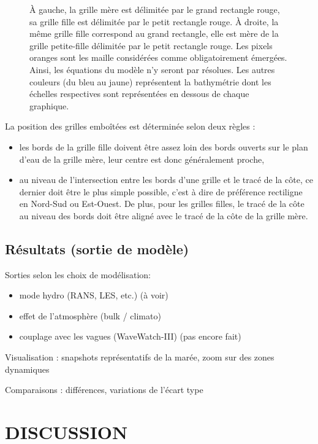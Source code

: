\documentclass[10pt,a4paper,titlepage]{article}
\begin{document}
\begin{figure}[h!]
{        À gauche, la grille mère est délimitée par le grand rectangle rouge, sa grille fille est délimitée par le petit rectangle rouge.
        À droite, la même grille fille correspond au grand rectangle, elle est mère de la grille petite-fille délimitée par le petit rectangle rouge.
        Les pixels oranges sont les maille considérées comme obligatoirement émergées. Ainsi, les équations du modèle n'y seront par résolues.
        Les autres couleurs (du bleu au jaune) représentent la bathymétrie dont les échelles respectives sont représentées en dessous de chaque graphique.
    }
    \label{fig:imbrication}
\end{figure}

La position des grilles emboîtées est déterminée selon deux règles :
\begin{itemize}
    \item les bords de la grille fille doivent être assez loin des bords ouverts sur le plan d'eau de la grille mère, leur centre est donc généralement proche,
    \item au niveau de l'intersection entre les bords d'une grille et le tracé de la côte, ce dernier doit être le plus simple possible, c'est à dire de préférence rectiligne en Nord-Sud ou Est-Ouest.
    De plus, pour les grilles filles, le tracé de la côte au niveau des bords doit être aligné avec le tracé de la côte de la grille mère.
\end{itemize}

\subsection{Résultats (sortie de modèle)}

Sorties selon les choix de modélisation:
\begin{itemize}
    \item mode hydro (RANS, LES, etc.) (à voir)
    \item effet de l'atmosphère (bulk / climato)
    \item couplage avec les vagues (WaveWatch-III) (pas encore fait)
\end{itemize}

Visualisation : snapshots représentatifs de la marée, zoom sur des zones dynamiques

Comparaisons : différences, variations de l'écart type

\newpage

\section{DISCUSSION}
\label{sec:discussion}
\end{document}
